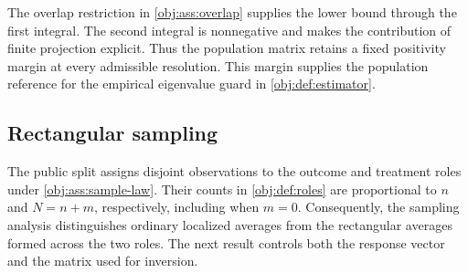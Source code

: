 \documentclass[11pt]{article}
\begin{document}
The overlap restriction in \cref{obj:ass:overlap} supplies the lower bound through the first integral. The second integral is nonnegative and makes the contribution of finite projection explicit. Thus the population matrix retains a fixed positivity margin at every admissible resolution. This margin supplies the population reference for the empirical eigenvalue guard in \cref{obj:def:estimator}.

\subsection{Rectangular sampling}

The public split assigns disjoint observations to the outcome and treatment roles under \cref{obj:ass:sample-law}. Their counts in \cref{obj:def:roles} are proportional to \(n\) and \(N=n+m\), respectively, including when \(m=0\). Consequently, the sampling analysis distinguishes ordinary localized averages from the rectangular averages formed across the two roles. The next result controls both the response vector and the matrix used for inversion.
\end{document}
